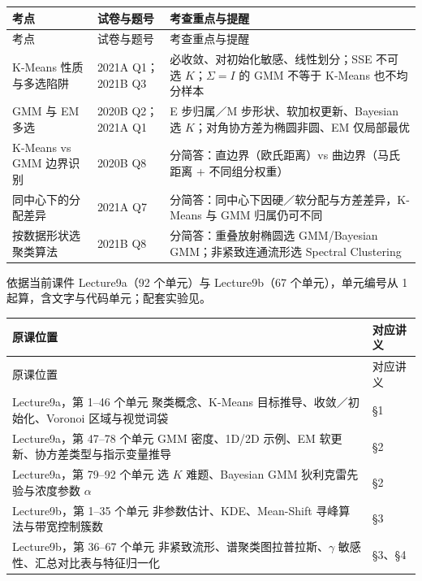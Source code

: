 \begingroup\small\setlength{\tabcolsep}{3pt}\renewcommand{\arraystretch}{1.22}
\begin{longtable}{@{}>{\raggedright\arraybackslash}p{}>{\raggedright\arraybackslash}p{}>{\raggedright\arraybackslash}p{}@{}}
\toprule
考点 & 试卷与题号 & 考查重点与提醒 \\
\midrule\endfirsthead
考点 & 试卷与题号 & 考查重点与提醒 \\
\midrule\endhead
\bottomrule\endfoot
K-Means 性质与多选陷阱 & 2021A Q1；2021B Q3 & 必收敛、对初始化敏感、线性划分；SSE 不可选 $K$；$\Sigma=I$ 的 GMM 不等于 K-Means 也不均分样本 \\
GMM 与 EM 多选 & 2020B Q2；2021A Q1 & E 步归属／M 步形状、软加权更新、Bayesian 选 $K$；对角协方差为椭圆非圆、EM 仅局部最优 \\
K-Means vs GMM 边界识别 & 2020B Q8 & 10 分简答：直边界（欧氏距离）vs 曲边界（马氏距离 + 不同组分权重） \\
同中心下的分配差异 & 2021A Q7 & 10 分简答：同中心下因硬／软分配与方差差异，K-Means 与 GMM 归属仍可不同 \\
按数据形状选聚类算法 & 2021B Q8 & 10 分简答：重叠放射椭圆选 GMM/Bayesian GMM；非紧致连通流形选 Spectral Clustering \\
\end{longtable}\endgroup



依据当前课件 Lecture9a（92 个单元）与 Lecture9b（67 个单元），单元编号从 1 起算，含文字与代码单元；配套实验见。

\begingroup\small\setlength{\tabcolsep}{3pt}\renewcommand{\arraystretch}{1.22}
\begin{longtable}{@{}>{\raggedright\arraybackslash}p{}>{\raggedright\arraybackslash}p{}@{}}
\toprule
原课位置 & 对应讲义 \\
\midrule\endfirsthead
原课位置 & 对应讲义 \\
\midrule\endhead
\bottomrule\endfoot
Lecture9a，第 1–46 个单元 聚类概念、K-Means 目标推导、收敛／初始化、Voronoi 区域与视觉词袋 & §1 \\
Lecture9a，第 47–78 个单元 GMM 密度、1D/2D 示例、EM 软更新、协方差类型与指示变量推导 & §2 \\
Lecture9a，第 79–92 个单元 选 $K$ 难题、Bayesian GMM 狄利克雷先验与浓度参数 $\alpha$ & §2 \\
Lecture9b，第 1–35 个单元 非参数估计、KDE、Mean-Shift 寻峰算法与带宽控制簇数 & §3 \\
Lecture9b，第 36–67 个单元 非紧致流形、谱聚类图拉普拉斯、$\gamma$ 敏感性、汇总对比表与特征归一化 & §3、§4 \\
\end{longtable}\endgroup
